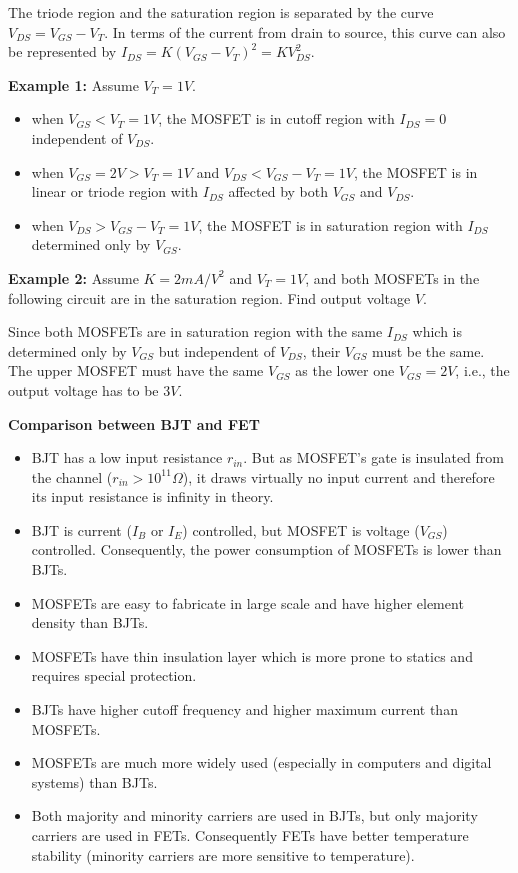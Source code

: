  The triode region and the saturation region is separated by the curve 
 $V_{DS}=V_{GS}-V_T$. In terms of the current from drain
 to source, this curve can also be represented by $I_{DS}=K(V_{GS}-V_T)^2=KV_{DS}^2$.

 {\bf Example 1:} Assume $V_T=1V$.
 \begin{itemize}
 \item when $V_{GS}<V_T=1V$, the MOSFET is in cutoff region with $I_{DS}=0$ independent
   of $V_{DS}$.
 \item when $V_{GS}=2V > V_T=1V$ and $V_{DS}<V_{GS}-V_T=1V$, the MOSFET is in linear or 
   triode region with $I_{DS}$ affected by both $V_{GS}$ and $V_{DS}$.
 \item when $V_{DS}>V_{GS}-V_T=1V$, the MOSFET is in saturation region with $I_{DS}$
   determined only by $V_{GS}$.
 \end{itemize}

 {\bf Example 2:} Assume $K=2 mA/V^2$ and $V_T=1V$, and both MOSFETs in the following 
 circuit are in the saturation region. Find output voltage $V$.


 Since both MOSFETs are in saturation region with the same $I_{DS}$ which is determined
 only by $V_{GS}$ but independent of $V_{DS}$, their $V_{GS}$ must be the same. The 
 upper MOSFET must have the same $V_{GS}$ as the lower one $V_{GS}=2V$, i.e., the 
 output voltage has to be $3V$.

 {\bf Comparison between BJT and FET}

 \begin{itemize}
 \item BJT has a low input resistance $r_{in}$. But as MOSFET's gate is
   insulated from the channel ($r_{in}>10^{11} \Omega$), it draws virtually
   no input current and therefore its input resistance is infinity in theory.
 \item BJT is current ($I_B$ or $I_E$) controlled, but MOSFET is voltage 
   ($V_{GS}$) controlled. Consequently, the power consumption of MOSFETs 
   is lower than BJTs.
 \item MOSFETs are easy to fabricate in large scale and have higher element
   density than BJTs.
 \item MOSFETs have thin insulation layer which is more prone to statics
   and requires special protection. 
 \item BJTs have higher cutoff frequency and higher maximum current than 
   MOSFETs.
 \item MOSFETs are much more widely used (especially in computers and 
   digital systems) than BJTs.
 \item Both majority and minority carriers are used in BJTs, but only 
   majority carriers are used in FETs. Consequently FETs have better
   temperature stability (minority carriers are more sensitive to
   temperature).

 \end{itemize}

